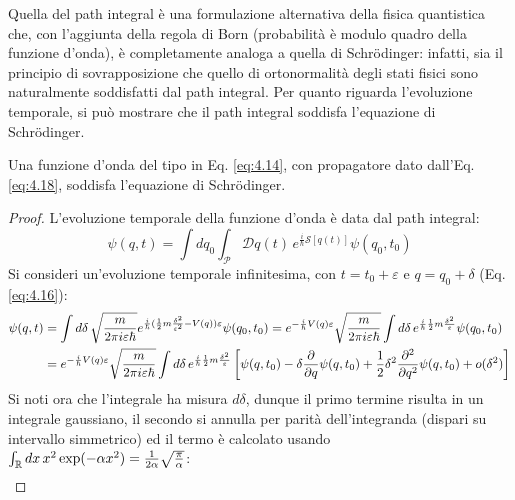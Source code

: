 Quella del path integral è una formulazione alternativa della fisica quantistica che, con l'aggiunta della regola di Born (probabilità è modulo quadro della funzione d'onda), è completamente analoga a quella di Schrödinger: infatti, sia il principio di sovrapposizione che quello di ortonormalità degli stati fisici sono naturalmente soddisfatti dal path integral. Per quanto riguarda l'evoluzione temporale, si può mostrare che il path integral soddisfa l'equazione di Schrödinger.

\begin{proposition}
	Una funzione d'onda del tipo in Eq. \ref{eq:4.14}, con propagatore dato dall'Eq. \ref{eq:4.18}, soddisfa l'equazione di Schrödinger.
\end{proposition}
\begin{proof}
	L'evoluzione temporale della funzione d'onda è data dal path integral:
	\begin{equation*}
		\psi(q,t) = \int dq_0 \int_{\mathscr{P}} \mathcal{D}q(t)\, e^{\frac{i}{\hbar}\mathcal{S}[q(t)]} \psi(q_0,t_0)
	\end{equation*}
	Si consideri un'evoluzione temporale infinitesima, con $ t = t_0 + \varepsilon $ e $ q = q_0 + \delta $ (Eq. \ref{eq:4.16}):
	\begin{equation*}
		\begin{split}
			\psi(q,t)
			&= \int d\delta\, \sqrt{\frac{m}{2\pi i \varepsilon \hbar}} e^{\frac{i}{\hbar} (\frac{1}{2} m \frac{\delta^2}{\varepsilon^2} - V(q)) \varepsilon} \psi(q_0,t_0) = e^{-\frac{i}{\hbar} V(q) \varepsilon} \sqrt{\frac{m}{2\pi i \varepsilon \hbar}} \int d\delta\, e^{\frac{i}{\hbar} \frac{1}{2} m \frac{\delta^2}{\varepsilon}} \psi(q_0,t_0) \\
			&= e^{-\frac{i}{\hbar} V(q)\varepsilon} \sqrt{\frac{m}{2\pi i \varepsilon \hbar}} \int d\delta\, e^{\frac{i}{\hbar} \frac{1}{2} m \frac{\delta^2}{\varepsilon}} \left[ \psi(q,t_0) - \delta \frac{\partial}{\partial q} \psi(q,t_0) + \frac{1}{2} \delta^2 \frac{\partial^2}{\partial q^2} \psi(q,t_0) + o(\delta^2) \right]
		\end{split}
	\end{equation*}
	Si noti ora che l'integrale ha misura $ d\delta $, dunque il primo termine risulta in un integrale gaussiano, il secondo si annulla per parità dell'integranda (dispari su intervallo simmetrico) ed il termo è calcolato usando $ \int_{\mathbb{R}} dx\, x^2 \exp (-\alpha x^2) = \frac{1}{2\alpha} \sqrt{\frac{\pi}{\alpha}} $:
	\begin{equation*}
		\begin{split}

\end{split}
\end{equation*}
\end{proof}
